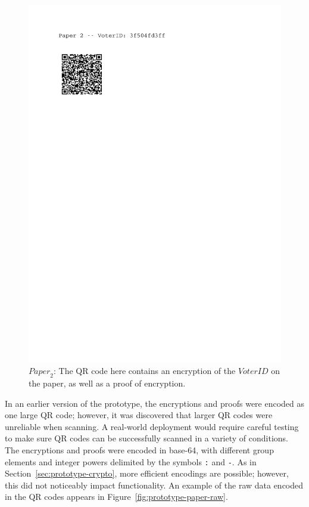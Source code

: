 \documentclass[12pt,a4paper]{article}
\theoremstyle{definition}
\newcommand{\VoterID}{\mathit{VoterID}}
\newcommand{\Paper}{\mathit{Paper}}
\begin{document}
\begin{figure}
	\includegraphics[scale=0.6, trim=0cm 22cm 4cm 0cm, clip=true]{paper2.pdf}
	\caption{$\Paper_2$: The QR code here contains an encryption of the $\VoterID$ on the paper, as well as a proof of encryption.}
		\label{fig:prototype-paper2}
\end{figure}

In an earlier version of the prototype, the encryptions and proofs were encoded as one large QR code; however, it was discovered that larger QR codes were unreliable when scanning. A real-world deployment would require careful testing to make sure QR codes can be successfully scanned in a variety of conditions.
The encryptions and proofs were encoded in base-64, with different group elements and integer powers delimited by the symbols \texttt{:} and \texttt{-}. As in Section~\ref{sec:prototype-crypto}, more efficient encodings are possible; however, this did not noticeably impact functionality. An example of the raw data encoded in the QR codes appears in Figure~\ref{fig:prototype-paper-raw}.
\end{document}
